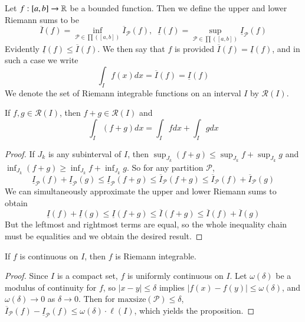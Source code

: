 \begin{defn}
    Let $f:[a,b]\rightarrow \mathbb R$ be a bounded function. Then we define the upper and lower Riemann sums to be $$\overline{I}(f) = \inf_{\mathcal{P} \in \prod([a,b])}\overline{I}_{\mathcal{P}}(f),\;\;\underline{I}(f) = \sup_{\mathcal{P} \in \prod([a,b])}\underline{I}_{\mathcal{P}}(f)$$
    Evidently $\underline{I}(f)\leq \overline{I}(f)$. We then say that $f$ is  provided $\overline{I}(f) = \underline{I}(f)$, and in such a case we write $$\int_If(x)dx = \overline{I}(f) = \underline{I}(f)$$
    We denote the set of Riemann integrable functions on an interval $I$ by $\mathcal{R}(I)$.
\end{defn}

\begin{prop}
    If $f,g \in \mathcal{R}(I)$, then $f+g \in \mathcal{R}(I)$ and $$\int_I(f+g)dx = \int_Ifdx + \int_Igdx$$
\end{prop}
\begin{proof}
    If $J_k$ is any subinterval of $I$, then $\sup_{J_k}(f+g) \leq \sup_{J_k}f+\sup_{J_k}g$ and $\inf_{J_k}(f+g) \geq \inf_{J_k}f+\inf_{J_k}g$. So for any partition $\mathcal{P}$, $$\underline{I}_{\mathcal{P}}(f) + \underline{I}_{\mathcal{P}}(g) \leq \underline{I}_{\mathcal{P}}(f+g) \leq \overline{I}_{\mathcal{P}}(f+g) \leq \overline{I}_{\mathcal{P}}(f)+\overline{I}_{\mathcal{P}}(g)$$ We can simultaneously approximate the upper and lower Riemann sums to obtain $$\underline{I}(f) + \underline{I}(g) \leq \underline{I}(f+g) \leq \overline{I}(f+g) \leq \overline{I}(f)+\overline{I}(g)$$ But the leftmost and rightmost terms are equal, so the whole inequality chain must be equalities and we obtain the desired result.
\end{proof}

\begin{prop}
    If $f$ is continuous on $I$, then $f$ is Riemann integrable.
\end{prop}
\begin{proof}
    Since $I$ is a compact set, $f$ is uniformly continuous on $I$. Let $\omega(\delta)$ be a modulus of continuity for $f$, so $|x-y| \leq \delta$ implies $|f(x)-f(y)|\leq \omega(\delta)$, and $\omega(\delta)\rightarrow 0$ as $\delta \rightarrow 0$. Then for $\text{maxsize}(\mathcal{P})\leq \delta$, $\overline{I}_{\mathcal{P}}(f) - \underline{I}_{\mathcal{P}}(f) \leq \omega(\delta)\cdot\ell(I)$, which yields the proposition.
\end{proof}

